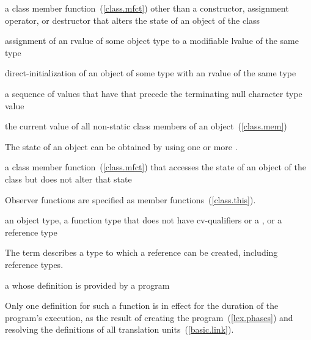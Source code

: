 %
a class member function~(\ref{class.mfct}) other than a constructor,
assignment operator, or destructor
that alters the state of an object of the class

%
assignment of an rvalue of some object type to a modifiable lvalue of the same type

%
direct-initialization of an object of some type with an rvalue of the same type

%
%
a sequence of values that have
that precede the terminating null character type
value

%
the current value of all non-static class members of an object~(\ref{class.mem})\\
\begin{note}
The state of an object can be obtained by using one or more
.
\end{note}

%
a class member function~(\ref{class.mfct}) that accesses the state of an object of the class 
but does not alter that state\\
\begin{note}
Observer functions are specified as
member functions~(\ref{class.this}).
\end{note}

%
an object type, a function type that does not have cv-qualifiers or a
, or a reference type
\begin{note} The term describes a type to which a reference can be created,
including reference types. \end{note}

%
a
whose definition is provided by a \Cpp program\\
\begin{note}
Only one definition for such a function is in effect for the duration of the program's
execution, as the result of creating the program~(\ref{lex.phases}) and resolving the
definitions of all translation units~(\ref{basic.link}).
\end{note}

